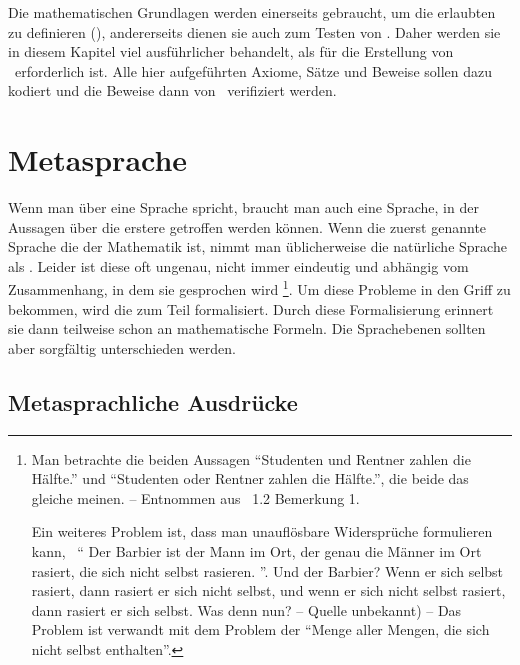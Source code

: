 Die mathematischen Grundlagen werden einerseits gebraucht, um die erlaubten  zu definieren (), andererseits dienen sie auch zum Testen von \ASBA.
Daher werden sie in diesem Kapitel viel ausführlicher behandelt, als für die Erstellung von \ASBA\ erforderlich ist.
Alle hier aufgeführten Axiome, Sätze und Beweise sollen dazu kodiert und die Beweise dann von \ASBA\ verifiziert werden.

\section{Metasprache}%
\label{sec:Metasprache}

Wenn man über eine Sprache spricht, braucht man auch eine Sprache, in der Aussagen über die erstere getroffen werden können.
Wenn die zuerst genannte Sprache die der Mathematik ist, nimmt man üblicherweise die natürliche Sprache als .
Leider ist diese oft ungenau, nicht immer eindeutig und abhängig vom Zusammenhang, in dem sie gesprochen wird%
\footnote{%
	Man betrachte die beiden Aussagen \enquote{Studenten und Rentner zahlen die Hälfte.} und \enquote{Studenten oder Rentner zahlen die Hälfte.}, die beide das gleiche meinen.
	-- Entnommen aus \cite{bib:Rautenberg} \sectionname~1.2 Bemerkung 1.

	Ein weiteres Problem ist, dass man unauflösbare Widersprüche formulieren kann, \textzB\ \enquote{%
		Der Barbier ist der Mann im Ort, der genau die Männer im Ort rasiert, die sich nicht selbst rasieren.%
	}.
	Und der Barbier?
	Wenn er sich selbst rasiert, dann rasiert er sich nicht selbst, und wenn er sich nicht selbst rasiert, dann rasiert er sich selbst.
	Was denn nun?
	-- Quelle unbekannt) --
	Das Problem ist verwandt mit dem Problem der \enquote{Menge aller Mengen, die sich nicht selbst enthalten}.%
}.
Um diese Probleme in den Griff zu bekommen, wird die  zum Teil formalisiert.
Durch diese Formalisierung erinnert sie dann teilweise schon an mathematische Formeln.
Die Sprachebenen sollten aber sorgfältig unterschieden werden.

\subsection{Metasprachliche Ausdrücke}%
\label{sub:Metaausdruck}

